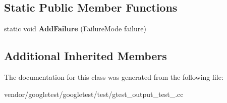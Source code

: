 \subsection*{Static Public Member Functions}
\begin{DoxyCompactItemize}
\item 
\mbox{\label{class_expect_failure_test_ab9aeb7820ff7953fc2975ecc5abd046b}} 
static void {\bfseries Add\+Failure} (Failure\+Mode failure)
\end{DoxyCompactItemize}
\subsection*{Additional Inherited Members}


The documentation for this class was generated from the following file\+:\begin{DoxyCompactItemize}
\item 
vendor/googletest/googletest/test/gtest\+\_\+output\+\_\+test\+\_\+.\+cc\end{DoxyCompactItemize}
